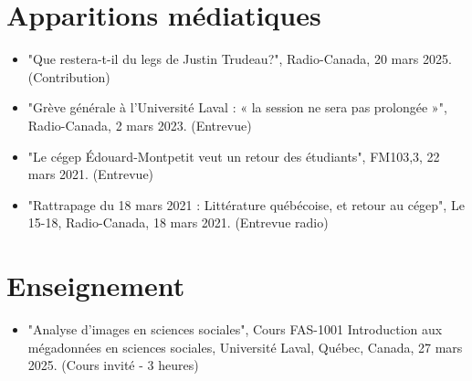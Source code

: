 \documentclass[11pt,letterpaper,sans]{moderncv}        %
\begin{document}
\section{Apparitions médiatiques}
\begin{itemize}
  \item "Que restera-t-il du legs de Justin Trudeau?", Radio-Canada, 20 mars 2025. (Contribution)
  \item "Grève générale à l'Université Laval : « la session ne sera pas prolongée »", Radio-Canada, 2 mars 2023. (Entrevue)
  \item "Le cégep Édouard-Montpetit veut un retour des étudiants", FM103,3, 22 mars 2021. (Entrevue)
  \item "Rattrapage du 18 mars 2021 : Littérature québécoise, et retour au cégep", Le 15-18, Radio-Canada, 18 mars 2021. (Entrevue radio)
\end{itemize}

\section{Enseignement}
\begin{itemize}
  \item "Analyse d'images en sciences sociales", Cours FAS-1001 Introduction aux mégadonnées en sciences sociales, Université Laval, Québec, Canada, 27 mars 2025. (Cours invité - 3 heures)
\end{itemize}
\end{document}
